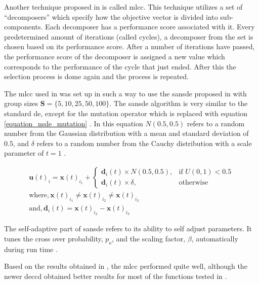 \documentclass[hidelinks,english,conference]{IEEEtran}
\begin{document}
    Another technique proposed in \cite{yang2008multilevel} is called \gls{mlcc}. This technique utilizes a set of ``decomposers'' which specify how the objective vector is divided into sub-components. Each decomposer has a performance score associated with it. Every predetermined amount of iterations (called cycles), a decomposer from the set is chosen based on its performance score. After a number of iterations have passed, the performance score of the decomposer is assigned a new value which corresponds to the performance of the cycle that just ended. After this the selection process is dome again and the process is repeated.
    
    The \gls{mlcc} used in \cite{yang2008multilevel} was set up in such a way to use the \gls{sansde} proposed in \cite{yang2007differential} with group sizes $\textbf{S}= \lbrace 5, 10, 25, 50, 100 \rbrace$. The \gls{sansde} algorithm is very similar to the standard \gls{de}, except for the mutation operator which is replaced with equation \ref{equation_nsde_mutation} \cite{yang2007differential}. In this equation $N(0.5, 0.5)$ refers to a random number from the Gaussian distribution with a mean and standard deviation of $0.5$, and $\delta$ refers to a random number from the Cauchy distribution with a scale parameter of $t=1$ \cite{yang2007differential}.
    
    \begin{equation}
      \begin{split}
        \textbf{u}(t)_i = \textbf{x}(t)_{i_1} +          
        \begin{cases}
          \textbf{d}_{i}(t) \times N(0.5,0.5), & \text{if } U(0,1) < 0.5\\
          \textbf{d}_{i}(t) \times \delta, & \text{otherwise}
        \end{cases}\\ 
        \text{where}, \textbf{x}(t)_{i_1} \neq \textbf{x}(t)_{i_2} \neq \textbf{x}(t)_{i_3}\\
        \text{and}, \textbf{d}_{i}(t) = \textbf{x}(t)_{i_2} - \textbf{x}(t)_{i_3}
      \end{split}
      \label{equation_nsde_mutation}
    \end{equation}
    
    The self-adaptive part of \gls{sansde} refers to its ability to self adjust parameters. It tunes the cross over probability, $p_o$, and the scaling factor, $\beta$, automatically during run time \cite{yang2007differential}.
    
    Based on the results obtained in \cite{yang2008multilevel}, the \gls{mlcc} performed quite well, although the newer \gls{deccd} obtained better results for most of the functions tested in \cite{omidvar2010cooperative}.
    
\end{document}
